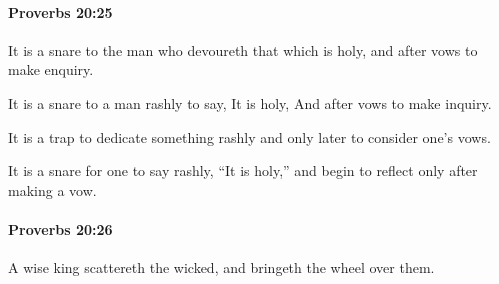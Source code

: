 		\paragraph{Proverbs 20:25} %
			\label{PROVERBS-20-25}

			It is a snare to the man who devoureth that which is holy, and after vows to make enquiry.

			\begin{versebox}
					\item[BHS] 
					\item[ASV] It is a snare to a man rashly to say, It is holy, And after vows to make inquiry.
					\item[NIV] It is a trap to dedicate something rashly and only later to consider one’s vows.
					\item[NRSV] It is a snare for one to say rashly, “It is holy,” and begin to reflect only after making a vow.
			\end{versebox}

		\paragraph{Proverbs 20:26} %
			\label{PROVERBS-20-26}

			A wise king scattereth the wicked, and bringeth the wheel over them.

